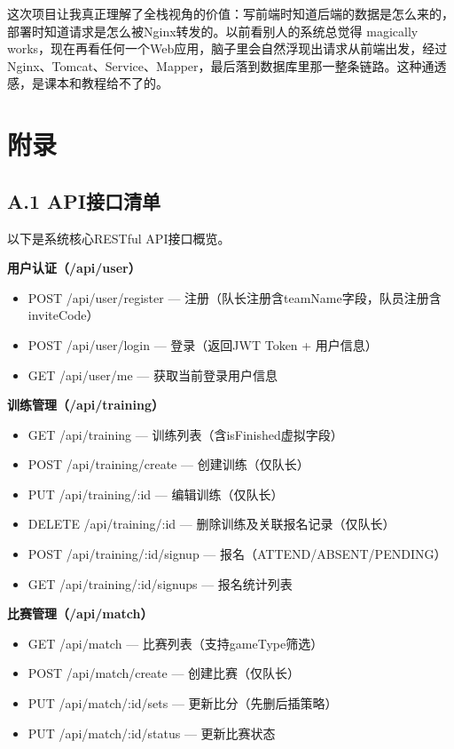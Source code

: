 \documentclass[12pt,a4paper]{ctexart}
\begin{document}
这次项目让我真正理解了全栈视角的价值：写前端时知道后端的数据是怎么来的，部署时知道请求是怎么被Nginx转发的。以前看别人的系统总觉得 magically works，现在再看任何一个Web应用，脑子里会自然浮现出请求从前端出发，经过Nginx、Tomcat、Service、Mapper，最后落到数据库里那一整条链路。这种通透感，是课本和教程给不了的。

\newpage
\section*{附录}

\subsection*{A.1 \quad API接口清单}

以下是系统核心RESTful API接口概览。

\textbf{用户认证（/api/user）}
\begin{itemize}[leftmargin=2em]
\item POST /api/user/register — 注册（队长注册含teamName字段，队员注册含inviteCode）
\item POST /api/user/login — 登录（返回JWT Token + 用户信息）
\item GET /api/user/me — 获取当前登录用户信息
\end{itemize}

\textbf{训练管理（/api/training）}
\begin{itemize}[leftmargin=2em]
\item GET /api/training — 训练列表（含isFinished虚拟字段）
\item POST /api/training/create — 创建训练（仅队长）
\item PUT /api/training/:id — 编辑训练（仅队长）
\item DELETE /api/training/:id — 删除训练及关联报名记录（仅队长）
\item POST /api/training/:id/signup — 报名（ATTEND/ABSENT/PENDING）
\item GET /api/training/:id/signups — 报名统计列表
\end{itemize}

\textbf{比赛管理（/api/match）}
\begin{itemize}[leftmargin=2em]
\item GET /api/match — 比赛列表（支持gameType筛选）
\item POST /api/match/create — 创建比赛（仅队长）
\item PUT /api/match/:id/sets — 更新比分（先删后插策略）
\item PUT /api/match/:id/status — 更新比赛状态
\end{itemize}
\end{document}
